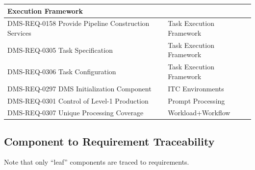\documentclass[DM,lsstdraft,toc]{lsstdoc}
\begin{document}
\begin{xtabular}{|p{0.4\textwidth}|p{0.55\textwidth}|}
Execution Framework\\ \hline
DMS-REQ-0158 Provide Pipeline Construction Services & Task Execution
Framework\\ \hline
DMS-REQ-0305 Task Specification & Task Execution
Framework\\ \hline
DMS-REQ-0306 Task Configuration & Task Execution
Framework\\ \hline
DMS-REQ-0297 DMS Initialization Component & ITC
Environments\\ \hline
DMS-REQ-0301 Control of Level-1 Production & Prompt
Processing\\ \hline
DMS-REQ-0307 Unique Processing Coverage &
Workload+Workflow\\ \hline
\end{xtabular}


\subsection{Component to Requirement
Traceability}\label{component-to-requirement-traceability}

Note that only ``leaf'' components are traced to requirements.
\end{document}
